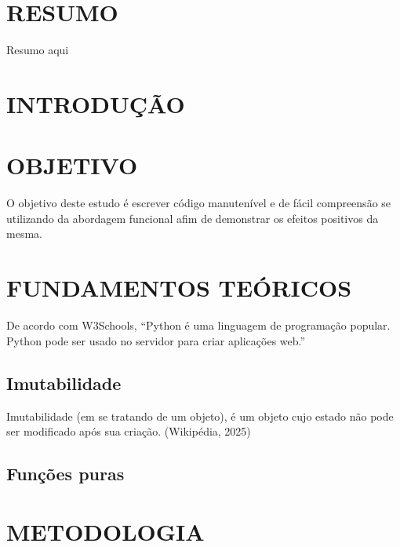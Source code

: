 \documentclass[date,twocolumn,a4paper]{ppgem}
\begin{document}
    \thispagestyle{plain}
    \makeheader




    \section*{RESUMO}
    Resumo aqui

    \section{INTRODUÇÃO}


    \section{OBJETIVO}
    O objetivo deste estudo é escrever código manutenível e de fácil compreensão se utilizando da abordagem funcional
    afim de demonstrar os efeitos positivos da mesma.

    \section{FUNDAMENTOS TEÓRICOS}
    De acordo com W3Schools\cite{w3schools_python}, ``Python é uma linguagem de programação popular. Python pode ser usado no servidor para criar aplicações web.''
    \subsection{Imutabilidade}
    Imutabilidade (em se tratando de um objeto), é um objeto cujo estado não pode ser modificado após sua criação. (Wikipédia, 2025)\cite{wiki_immutable}
    \subsection{Funções puras}

    \section{METODOLOGIA}
\end{document}
